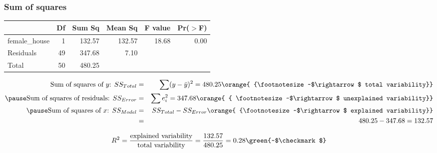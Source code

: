 \begin{frame}[fragile]
\frametitle{Sum of squares}

\vspace{-0.5cm}

{\small
\begin{center}
\begin{tabular}{lrrrrr}
  \hline
 & Df & Sum Sq & Mean Sq & F value & Pr($>$F) \\ 
  \hline
female\_house & 1 & 132.57 & 132.57 & 18.68 & 0.00 \\ 
  Residuals & 49 & 347.68 & 7.10 &  &  \\ 
   \hline
Total & 50 & 480.25 \\
   \hline
\end{tabular}
\end{center}
}

\pause

\begin{changemargin}{-1cm}{-1cm}
\begin{eqnarray*}
\text{Sum of squares of $y$: } SS_{Total} &=& \sum(y - \bar{y})^2 = 480.25 \orange{ {\footnotesize ~$\rightarrow$ total variability}} \\
\pause
\text{Sum of squares of residuals: } SS_{Error} &=& \sum e_i^2 = 347.68 \orange{ { \footnotesize ~$\rightarrow$ unexplained variability}} \\
\pause
\text{Sum of squares of $x$: } SS_{Model} &=& SS_{Total} - SS_{Error} \orange{ {\footnotesize ~$\rightarrow$ explained variability}} \\
&=& 480.25 - 347.68 = 132.57
\end{eqnarray*}
\end{changemargin}

\pause

\[ R^2 = \frac{\text{explained variability}}{\text{total variability}} = \frac{132.57}{480.25} = 0.28 \green{~$\checkmark$} \]

\end{frame}


